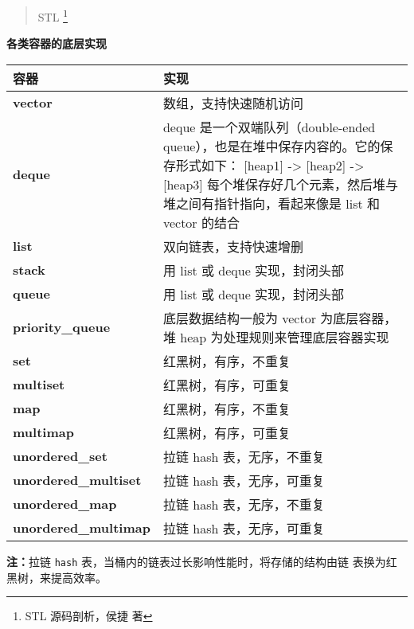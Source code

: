 \begin{quotation}
  {\color{red}STL}%
  \footnote{STL 源码剖析，侯捷 \quad 著}%
\end{quotation}

\noindent\textbf{各类容器的底层实现}

\begin{center}
  \begin{tabular}{lp{24em}}
    \hline
    容器 & 实现 \\
    \hline
    \textbf{\ttfamily vector} & 数组，支持快速随机访问 \\
    \textbf{\ttfamily deque}  & deque 是一个双端队列（double-ended queue），也是在堆中保存内容的。它的保存形式如下： [heap1] -> [heap2] -> [heap3] 每个堆保存好几个元素，然后堆与堆之间有指针指向，看起来像是 list 和 vector 的结合 \\
    \textbf{\ttfamily list}   & 双向链表，支持快速增删 \\
    \textbf{\ttfamily stack} & 用 list 或 deque 实现，封闭头部 \\
    \textbf{\ttfamily queue} & 用 list 或 deque 实现，封闭头部 \\
    \textbf{\ttfamily priority\_queue} & 底层数据结构一般为 vector 为底层容器，堆 heap 为处理规则来管理底层容器实现 \\
    \textbf{\ttfamily set} & 红黑树，有序，不重复 \\
    \textbf{\ttfamily multiset} & 红黑树，有序，可重复 \\
    \textbf{\ttfamily map} & 红黑树，有序，不重复 \\
    \textbf{\ttfamily multimap} & 红黑树，有序，可重复 \\
    \textbf{\ttfamily unordered\_set} & 拉链 hash 表，无序，不重复 \\
    \textbf{\ttfamily unordered\_multiset} & 拉链 hash 表，无序，可重复 \\
    \textbf{\ttfamily unordered\_map} & 拉链 hash 表，无序，不重复 \\
    \textbf{\ttfamily unordered\_multimap} & 拉链 hash 表，无序，可重复 \\ 
    \hline
  \end{tabular}
\end{center}

\begin{center}
  \textbf{注：}拉链 \verb|hash| 表，当桶内的链表过长影响性能时，将存储的结构由链
  表换为红黑树，来提高效率。
\end{center}

